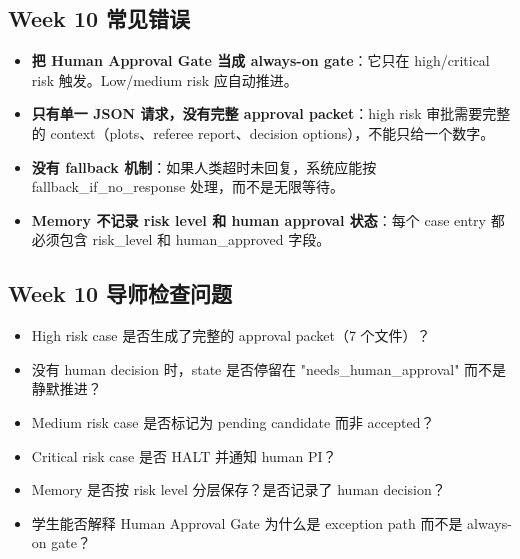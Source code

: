 \documentclass[11pt,a4paper,fontset=none]{ctexart}
\begin{document}
\subsection{Week 10 常见错误}
\begin{itemize}[leftmargin=2em]
  \item \textbf{把 Human Approval Gate 当成 always-on gate}：它只在 high/critical risk 触发。Low/medium risk 应自动推进。
  \item \textbf{只有单一 JSON 请求，没有完整 approval packet}：high risk 审批需要完整的 context（plots、referee report、decision options），不能只给一个数字。
  \item \textbf{没有 fallback 机制}：如果人类超时未回复，系统应能按 fallback\_if\_no\_response 处理，而不是无限等待。
  \item \textbf{Memory 不记录 risk level 和 human approval 状态}：每个 case entry 都必须包含 risk\_level 和 human\_approved 字段。
\end{itemize}

\subsection{Week 10 导师检查问题}
\begin{itemize}[leftmargin=2em]
  \item High risk case 是否生成了完整的 approval packet（7 个文件）？
  \item 没有 human decision 时，state 是否停留在 "needs\_human\_approval" 而不是静默推进？
  \item Medium risk case 是否标记为 pending candidate 而非 accepted？
  \item Critical risk case 是否 HALT 并通知 human PI？
  \item Memory 是否按 risk level 分层保存？是否记录了 human decision？
  \item 学生能否解释 Human Approval Gate 为什么是 exception path 而不是 always-on gate？
\end{itemize}
\end{document}
